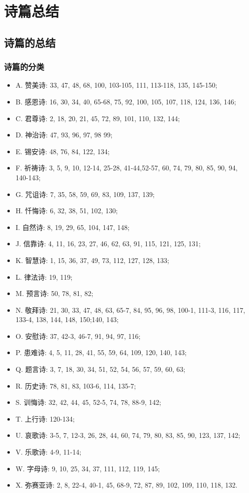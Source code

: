 \chapter{诗篇总结}
\section{诗篇的总结}
\subsection{诗篇的分类}
\begin{itemize}
\itemsep-.45em 
\item A.  赞美诗: 33, 47, 48, 68, 100, 103-105, 111, 113-118, 135, 145-150;
\item B.  感恩诗: 16, 30, 34, 40, 65-68, 75, 92, 100, 105, 107, 118, 124, 136, 146;
\item C.  君尊诗: 2, 18, 20, 21, 45, 72, 89, 101, 110, 132, 144;
\item D.  神治诗: 47, 93, 96, 97, 98 99;
\item E.  锡安诗: 48, 76, 84, 122, 134;
\item F.  祈祷诗: 3, 5, 9, 10, 12-14, 25-28, 41-44,52-57, 60, 74, 79, 80, 85, 90, 94, 140-143;
\item G.  咒诅诗: 7, 35, 58, 59, 69, 83, 109, 137, 139;
\item H.  忏悔诗: 6, 32, 38, 51, 102, 130;
\item I.  自然诗: 8, 19, 29, 65, 104, 147, 148;
\item J.  信靠诗: 4, 11, 16, 23, 27, 46, 62, 63, 91, 115, 121, 125, 131;
\item K.  智慧诗: 1, 15, 36, 37, 49, 73, 112, 127, 128, 133;
\item L.  律法诗: 19, 119;
\item M.  预言诗: 50, 78, 81, 82;
\item N.  敬拜诗: 21, 30, 33, 47, 48, 63, 65-7, 84, 95, 96, 98, 100-1, 111-3, 116, 117, 133-4, 138, 144, 148, 150;140, 143;
\item O. 安慰诗: 37, 42-3, 46-7, 91, 94, 97, 116;
\item P.  患难诗: 4, 5, 11, 28, 41, 55, 59, 64, 109, 120, 140, 143;
\item Q.  题言诗: 3, 7, 18, 30, 34, 51, 52, 54, 56, 57, 59, 60, 63;
\item R.  历史诗: 78, 81, 83, 103-6, 114, 135-7;
\item S.  训悔诗: 32, 42, 44, 45, 52-5, 74, 78, 88-9, 142;
\item T.  上行诗: 120-134;
\item U.  哀歌诗: 3-5, 7, 12-3, 26, 28, 44, 60, 74, 79, 80, 83, 85, 90, 123, 137, 142;
\item V.  乐歌诗: 4-9, 11-14;
\item W.  字母诗: 9, 10, 25, 34, 37, 111, 112, 119, 145;
\item X.  弥赛亚诗: 2, 8, 22-4, 40-1, 45, 68-9, 72, 87, 89, 102, 109, 110, 118, 132. 
\end{itemize}


